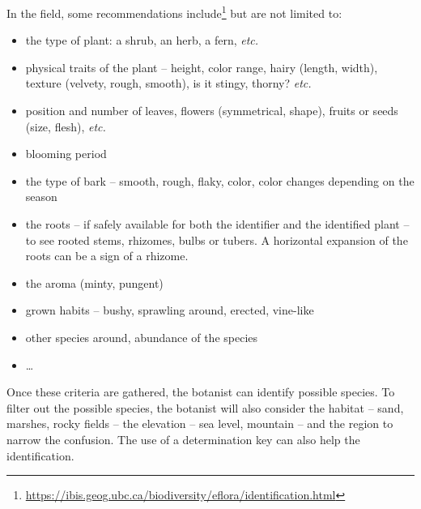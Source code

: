 In the field, some recommendations include\footnote{\url{https://ibis.geog.ubc.ca/biodiversity/eflora/identification.html}} but are not limited to:
\begin{itemize}
        \item the type of plant: a shrub, an herb, a fern, \emph{etc.}
        \item physical traits of the plant -- height, color range, hairy (length, width), texture (velvety, rough, smooth), is it stingy, thorny? \emph{etc.}
        \item position and number of leaves, flowers (symmetrical, shape), fruits or seeds (size, flesh), \emph{etc.}
        \item blooming period
        \item the type of bark -- smooth, rough, flaky, color, color changes depending on the season
        \item the roots -- if safely available for both the identifier and the identified plant -- to see rooted stems, rhizomes, bulbs or tubers. A horizontal expansion of the roots can be a sign of a rhizome.
        \item the aroma (minty, pungent)
        \item grown habits -- bushy, sprawling around, erected, vine-like
        \item other species around, abundance of the species
        \item \dots
\end{itemize}

Once these criteria are gathered, the botanist can identify possible species.
To filter out the possible species, the botanist will also consider the habitat -- sand, marshes, rocky fields -- the elevation -- sea level, mountain -- and the region to narrow the confusion.
The use of a determination key can also help the identification.

